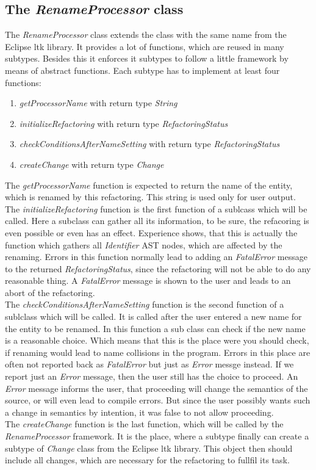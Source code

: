 \documentclass[a4paper,10pt]{report}
\begin{document}
\subsection{The {\it RenameProcessor} class}
\label{RenameProcessor}
The {\it RenameProcessor} class extends the class with the same name from the Eclipse ltk library.
It provides a lot of functions, which are reused in many subtypes.
Besides this it enforces it subtypes to follow a little framework by means of abstract functions.
Each subtype has to implement at least four functions:
   \begin{enumerate}
     \item {\it getProcessorName} with return type {\it String}
     \item {\it initializeRefactoring} with return type {\it RefactoringStatus}
     \item {\it checkConditionsAfterNameSetting}  with return type {\it RefactoringStatus}
     \item {\it createChange}  with return type {\it Change}
   \end{enumerate}
The {\it getProcessorName} function is expected to return the name of the entity, which is renamed by this refactoring.
This string is used only for user output.\\ 
The {\it initializeRefactoring} function is the first function of a sublcass which will be called.
Here a subclass can gather all its information, to be sure, the refacoring is even possible or even has an effect.
Experience shows, that this is actually the function which gathers all {\it Identifier} AST nodes, which are affected by the renaming.
Errors in this function normally lead to adding an {\it FatalError} message to the returned {\it RefactoringStatus}, since the refactoring
will not be able to do any reasonable thing. A {\it FatalError} message is shown to the user and leads to an abort of the refactoring.\\
The {\it checkConditionsAfterNameSetting} function is the second function of a sublclass which will be called.
It is called after the user entered a new name for the entity to be renamed.
In this function a sub class can check if the new name is a reasonable choice.
Which means that this is the place were you should check, if renaming would lead to name collisions in the program.
Errors in this place are often not reported back as {\it FatalError} but just as {\it Error} messge instead.
If we report just an {\it Error} message, then the user still has the choice to  proceed. An {\it Error} message informs the user, that proceeding
will change the semantics of the source, or will even lead to compile errors.
But since the user possibly wants such a change in semantics by intention, it was false to not allow proceeding.\\
The {\it createChange} function is the last function, which will be called by the {\it RenameProcessor} framework.
It is the place, where a subtype finally can create a subtype of {\it Change} class from the Eclipse ltk library.
This object then should include all changes, which are necessary for the refactoring to fullfil its task.
\end{document}
